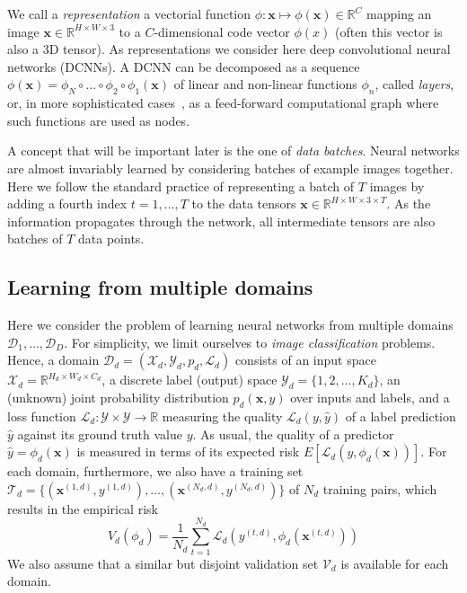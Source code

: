 \documentclass[10pt,twocolumn,letterpaper]{article}
\newcommand{\bx}{\mathbf{x}}
\begin{document}
We call a \emph{representation} a vectorial function $\phi: \bx \mapsto \phi(\bx)\in\mathbb{R}^C$ mapping an image $\bx \in \mathbb{R}^{H\times W \times 3}$ to a $C$-dimensional code vector $\phi(x)$ (often this vector is also a 3D tensor). As representations we consider here deep convolutional neural networks (DCNNs). A DCNN can be decomposed as a sequence $\phi(\bx)=\phi_N \circ \dots \circ \phi_2 \circ\phi_1(\bx)$ of linear and non-linear functions $\phi_n$, called \emph{layers}, or, in more sophisticated cases~\cite{szegedy16rethinking,he16deep}, as a feed-forward computational graph where such functions are used as nodes.

A concept that will be important later is the one of \emph{data batches}. Neural networks are almost invariably learned by considering batches of example images together. Here we follow the standard practice of representing a batch of $T$ images by adding a fourth index $t=1,\dots,T$ to the data tensors $\bx \in \mathbb{R}^{H\times W \times 3 \times T}$. As the information propagates through the network, all intermediate tensors are also batches of $T$ data points.

\subsection{Learning from multiple domains}\label{s:mdomain}


Here we consider the problem of learning neural networks from multiple domains $\mathcal{D}_1,\dots,\mathcal{D}_D$. For simplicity, we limit ourselves to \emph{image classification} problems. Hence, a domain $\mathcal{D}_d = (\mathcal{X}_d,\mathcal{Y}_d,p_d,\mathcal{L}_d)$ consists of an input space $\mathcal{X}_d=\mathbb{R}^{H_d\times W_d\times C_d}$, a discrete label (output) space $\mathcal{Y}_d =\{1,2,\dots,K_d\}$, an (unknown) joint probability distribution $p_d(\bx,y)$ over inputs and labels, and a loss function $\mathcal{L}_d:\mathcal{Y}\times\mathcal{Y}\rightarrow \mathbb{R}$ measuring the quality $\mathcal{L}_d(y,\hat y)$ of a label prediction $\hat y$ against its ground truth value $y$. As usual, the quality of a predictor $\hat y = \phi_d(\bx)$ is measured in terms of its expected risk $E[\mathcal{L}_d(y,\phi_d(\bx))]$. For each domain, furthermore, we also have a training set $\mathcal{T}_d=\{(\bx^{(1,d)},y^{(1,d)}),\dots,(\bx^{(N_d,d)},y^{(N_d,d)})\}$ of $N_d$ training pairs, which results in the empirical risk
\[
 V_d(\phi_d) = \frac{1}{N_d}\sum_{t=1}^{N_d} \mathcal{L}_d(y^{(t,d)},\phi_d(\bx^{(t,d)}))
\]
We also assume that a similar but disjoint validation set $\mathcal{V}_d$ is available for each domain.
\end{document}
